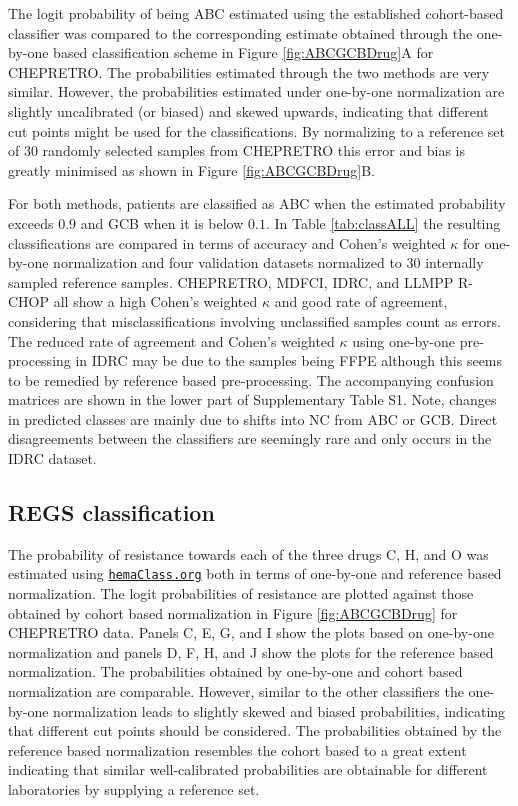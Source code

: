 \documentclass[twocolumn]{bmcart}%
\newcommand{\hemaClass}{\href{http://hemaClass.org}{\texttt{hemaClass.org}}}
\begin{document}
The logit probability of being ABC estimated using the established cohort-based classifier was compared to the corresponding estimate obtained through the one-by-one based classification scheme in Figure \ref{fig:ABCGCBDrug}A for CHEPRETRO.
The probabilities estimated through the two methods are very similar.
However, the probabilities estimated under one-by-one normalization are slightly uncalibrated (or biased) and skewed upwards, indicating that different cut points might be used for the classifications.
By normalizing to a reference set of $30$ randomly selected samples from CHEPRETRO this error and bias is greatly minimised as shown in Figure \ref{fig:ABCGCBDrug}B.

For both methods, patients are classified as ABC when the estimated probability exceeds $0.9$ and GCB when it is below $0.1$.
In Table \ref{tab:classALL} the resulting classifications are compared in terms of accuracy and Cohen's weighted $\kappa$ for one-by-one normalization and four validation datasets normalized to 30 internally sampled reference samples.
CHEPRETRO, MDFCI, IDRC, and LLMPP R-CHOP all show a high Cohen's weighted $\kappa$ and good rate of agreement, considering that misclassifications involving unclassified samples count as errors.
The reduced rate of agreement and Cohen's weighted $\kappa$ using one-by-one pre-processing in IDRC may be due to the samples being FFPE although this seems to be remedied by reference based pre-processing.
The accompanying confusion matrices are shown in the lower part of Supplementary Table S1. Note, changes in predicted classes are mainly due to shifts into NC from ABC or GCB.
Direct disagreements between the classifiers are seemingly rare and only occurs in the IDRC dataset.


\subsection{REGS classification}
The probability of resistance towards each of the three drugs C, H, and O was estimated using \hemaClass{} both in terms of one-by-one and reference based normalization.
The logit probabilities of resistance are plotted against those obtained by cohort based normalization in Figure \ref{fig:ABCGCBDrug} for CHEPRETRO data.
Panels C, E, G, and I show the plots based on one-by-one normalization and panels D, F, H, and J show the plots for the reference based normalization.
The probabilities obtained by one-by-one and cohort based normalization are comparable. However, similar to the other classifiers the one-by-one normalization leads to slightly skewed and biased probabilities, indicating that different cut points should be considered.
The probabilities obtained by the reference based normalization resembles the cohort based to a great extent indicating that similar well-calibrated probabilities are obtainable for different laboratories by supplying a reference set.
\end{document}
